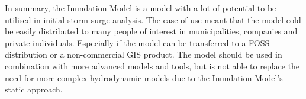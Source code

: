 In summary, the Inundation Model is a model with a lot of potential to be utilised in initial storm surge analysis. The ease of use meant that the model cold be easily distributed to many people of interest in municipalities, companies and private individuals. Especially if the model can be transferred to a FOSS distribution or a non-commercial GIS product. The model should be used in combination with more advanced models and tools, but is not able to replace the need for more complex hydrodynamic models due to the Inundation Model's static approach.